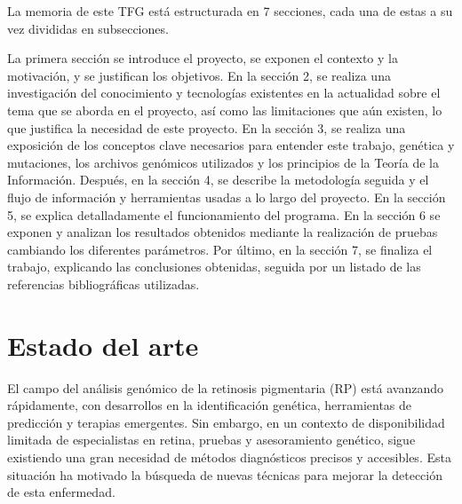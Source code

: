\documentclass[11pt,spanish,listoffigures,listoftables]{tfgetsinf}
\begin{document}
La memoria de este TFG está estructurada en 7 secciones, cada una de estas a su vez divididas en subsecciones.  


La primera sección se introduce el proyecto, se exponen el contexto y la motivación, y se justifican los objetivos. En la sección 2, se realiza una investigación del conocimiento y tecnologías existentes en la actualidad sobre el tema que se aborda en el proyecto, así como las limitaciones que aún existen, lo que justifica la necesidad de este proyecto. En la sección 3, se realiza una exposición de los conceptos clave necesarios para entender este trabajo, genética y mutaciones, los archivos genómicos utilizados y los principios de la Teoría de la Información. Después, en la sección 4, se describe la metodología seguida y el flujo de información y herramientas usadas a lo largo del proyecto. En la sección 5, se explica detalladamente el funcionamiento del programa. En la sección 6 se exponen y analizan los resultados obtenidos mediante la realización de pruebas cambiando los diferentes parámetros. Por último, en la sección 7, se finaliza el trabajo, explicando las conclusiones obtenidas, seguida por un listado de las referencias bibliográficas utilizadas. 





\chapter{Estado del arte}

El campo del análisis genómico de la retinosis pigmentaria (RP) está avanzando rápidamente, con desarrollos en la identificación genética, herramientas de predicción y terapias emergentes. Sin embargo, en un contexto de disponibilidad limitada de especialistas en retina, pruebas y asesoramiento genético, sigue existiendo una gran necesidad de métodos diagnósticos precisos y accesibles. Esta situación ha motivado la búsqueda de nuevas técnicas para mejorar la detección de esta enfermedad.
\end{document}
